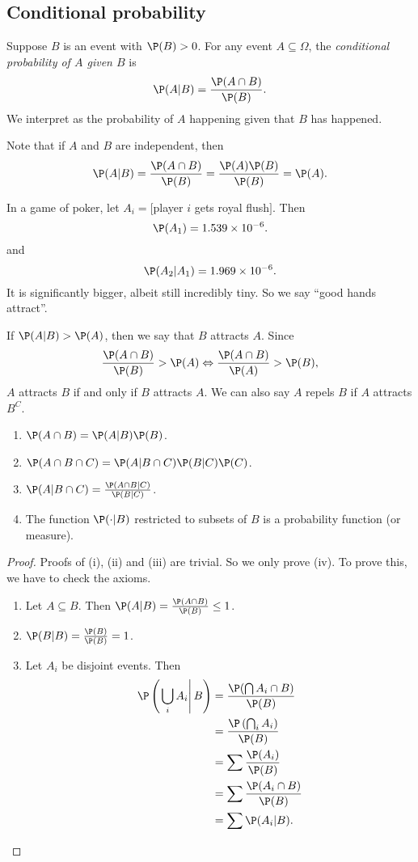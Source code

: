 \documentclass[a4paper]{article}
\begin{document}
\subsection{Conditional probability}
\begin{defi}
  Suppose $B$ is an event with $\P(B) > 0$. For any event $A\subseteq \Omega$, the \emph{conditional probability of $A$ given $B$} is
  \[
    \P(A|B) = \frac{\P(A\cap B)}{\P(B)}.
  \]
  We interpret as the probability of $A$ happening given that $B$ has happened.
\end{defi}
Note that if $A$ and $B$ are independent, then
\[
  \P(A|B) = \frac{\P(A\cap B)}{\P(B)} = \frac{\P(A)\P(B)}{\P(B)} = \P(A).
\]
\begin{eg}
  In a game of poker, let $A_i = [$player $i$ gets royal flush$]$. Then
  \[
    \P(A_1) = 1.539\times 10^{-6}.
  \]
  and
  \[
    \P(A_2|A_1) = 1.969\times 10^{-6}.
  \]
  It is significantly bigger, albeit still incredibly tiny. So we say ``good hands attract''.

  If $\P(A|B) > \P(A)$, then we say that $B$ attracts $A$. Since
  \[
    \frac{\P(A\cap B)}{\P(B)} > \P(A) \Leftrightarrow \frac{\P(A\cap B)}{\P(A)} > \P(B),
  \]
  $A$ attracts $B$ if and only if $B$ attracts $A$. We can also say $A$ repels $B$ if $A$ attracts $B^C$.
\end{eg}
\begin{thm}\leavevmode
  \begin{enumerate}
    \item $\P(A\cap B) = \P(A|B)\P(B)$.
    \item $\P(A\cap B\cap C) = \P(A|B\cap C) \P(B|C) \P(C)$.
    \item $\P(A|B\cap C) = \frac{\P(A\cap B|C)}{\P(B|C)}$.
    \item The function $\P(\cdot |B)$ restricted to subsets of $B$ is a probability function (or measure).
  \end{enumerate}
\end{thm}
\begin{proof}
  Proofs of (i), (ii) and (iii) are trivial. So we only prove (iv). To prove this, we have to check the axioms.

  \begin{enumerate}
    \item Let $A\subseteq B$. Then $\P(A|B) = \frac{\P(A\cap B)}{\P(B)} \leq 1$.
    \item $\P(B|B) = \frac{\P(B)}{\P(B)} = 1$.
    \item Let $A_i$ be disjoint events. Then
      \begin{align*}
        \P\left(\left.\bigcup_i A_i\right|B\right) &= \frac{\P(\bigcap A_i\cap B)}{\P(B)}\\
        &= \frac{\P\left(\bigcap_i A_i\right)}{\P(B)}\\
        &= \sum \frac{\P(A_i)}{\P(B)}\\
        &=\sum \frac{\P(A_i\cap B)}{\P(B)}\\
        &= \sum \P(A_i | B).
      \end{align*}
  \end{enumerate}
\end{proof}
\end{document}
